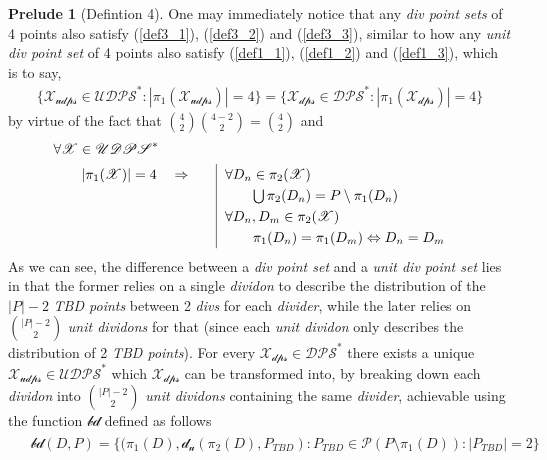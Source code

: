 \documentclass[11pt, oneside]{article}      %
\theoremstyle{definition}
\numberwithin{equation}{section}
\newcommand{\reff}[1]{(\ref{#1})}
\theoremstyle{c}
\newtheorem*{prelude}{Prelude}
\begin{document}
\begin{prelude}[Defintion 4]
One may immediately notice that any \textit{div point sets} of 4 points also satisfy \reff{def3_1}, \reff{def3_2} and \reff{def3_3}, similar to how any \textit{unit div point set} of 4 points also satisfy \reff{def1_1}, \reff{def1_2} and \reff{def1_3}, which is to say,
\begin{align}
\{\mathscr{X_{udps}} \in \mathscr{UDPS}^* : |\pi_1(\mathscr{X_{udps}})| = 4 \} = \{\mathscr{X_{dps}} \in \mathscr{DPS}^* : |\pi_1(\mathscr{X_{dps}})| = 4\}
\end{align}
by virtue of the fact that $\binom{4}{2}  \binom{4-2}{2} = \binom{4}{2}$ and
\begin{alignat}{2}
    & \forall \mathscr{X} \in \mathscr{UDPS}^* \notag \\
    &\qquad |\pi_1(\mathscr{X})| = 4 \quad \Rightarrow & \quad & \begin{aligned}[t] \renewcommand\arraystretch{1.25}\begin{array}[t]{|@{\hskip0.6em}l}
  \forall D_n \in \pi_2(\mathscr{X}) \\
   \qquad \bigcup \pi_2(D_n) = P \setminus \pi_1(D_n)  \\
     \forall D_n,D_m \in \pi_2(\mathscr{X}) \\
    \qquad  \pi_1(D_n)= \pi_1(D_m) \Leftrightarrow D_n=D_m
  \end{array}
  \end{aligned}
\end{alignat}
As we can see, the difference between a \textit{div point set} and a \textit{unit div point set} lies in that the former relies on a single \textit{dividon} to describe the distribution of the $|P|-2$ \textit{TBD points} between 2 \textit{divs} for each \textit{divider}, while the later relies on $\binom{|P|-2}{2}$ \textit{unit dividons} for that (since each \textit{unit dividon} only describes the distribution of 2 \textit{TBD points}). For every $\mathscr{X_{dps}} \in \mathscr{DPS}^*$ there exists a unique $\mathscr{X_{udps}} \in \mathscr{UDPS}^*$ which $\mathscr{X_{dps}}$ can be transformed into, by breaking down each \textit{dividon} into $\binom{|P|-2}{2}$ \textit{unit dividons} containing the same \textit{divider}, achievable using the function $\mathscr{bd}$ defined as follows
 \begin{align}
 \begin{split}\label{bd_d_u}
&\mathscr{bd}(D,P) = \{(\pi_1(D),\mathscr{d_u}(\pi_2(D),P_{TBD}) : P_{TBD} \in  \mathcal{P}(P \setminus \pi_1(D)) : |P_{TBD}| = 2\}

\end{split}
\end{align}
\end{prelude}
\end{document}
